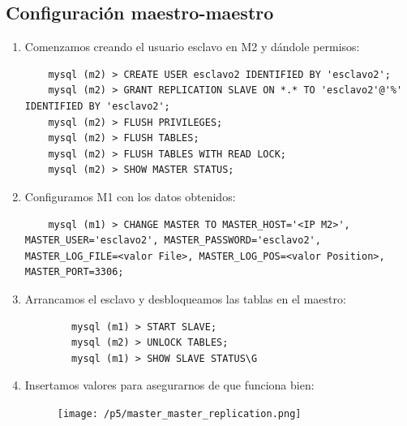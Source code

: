 \documentclass[12pt,spanish]{article}
\begin{document}
\subsection{Configuración maestro-maestro}
\begin{enumerate}
	\item Comenzamos creando el usuario esclavo en M2 y dándole permisos:
	\begin{lstlisting}
	mysql (m2) > CREATE USER esclavo2 IDENTIFIED BY 'esclavo2';
	mysql (m2) > GRANT REPLICATION SLAVE ON *.* TO 'esclavo2'@'%' IDENTIFIED BY 'esclavo2';
	mysql (m2) > FLUSH PRIVILEGES;
	mysql (m2) > FLUSH TABLES;
	mysql (m2) > FLUSH TABLES WITH READ LOCK;
	mysql (m2) > SHOW MASTER STATUS;
	\end{lstlisting}
	\item Configuramos M1 con los datos obtenidos:
	\begin{lstlisting}
	mysql (m1) > CHANGE MASTER TO MASTER_HOST='<IP M2>', MASTER_USER='esclavo2', MASTER_PASSWORD='esclavo2', MASTER_LOG_FILE=<valor File>, MASTER_LOG_POS=<valor Position>, MASTER_PORT=3306;
	\end{lstlisting}
	\item Arrancamos el esclavo y desbloqueamos las tablas en el maestro:
	\begin{lstlisting}
		mysql (m1) > START SLAVE;
		mysql (m2) > UNLOCK TABLES;
		mysql (m1) > SHOW SLAVE STATUS\G
	\end{lstlisting}
	\item Insertamos valores para asegurarnos de que funciona bien:
	\begin{figure}[H]
		\centering
		\texttt{[image: /p5/master\_master\_replication.png]}
	\end{figure}
\end{enumerate}
\end{document}
